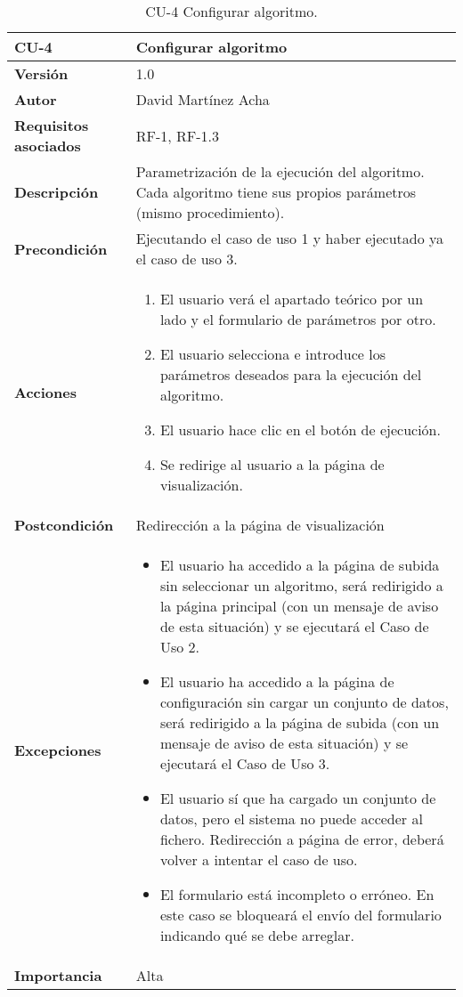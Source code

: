 \begin{table}[p]
	\centering
	\begin{tabularx}{\linewidth}{ p{} p{} }
		\toprule
		\textbf{CU-4}    & \textbf{Configurar algoritmo}\\
		\toprule
		\textbf{Versión}              & 1.0    \\
		\textbf{Autor}                & David Martínez Acha \\
		\textbf{Requisitos asociados} & RF-1, RF-1.3 \\
		\textbf{Descripción}          & Parametrización de la ejecución del algoritmo. Cada algoritmo tiene sus propios parámetros (mismo procedimiento). \\
		\textbf{Precondición}         & Ejecutando el caso de uso 1 y haber ejecutado ya el caso de uso 3. \\
		\textbf{Acciones}             &
		\begin{enumerate}
			\def\labelenumi{\arabic{enumi}.}
			\tightlist
			\item El usuario verá el apartado teórico por un lado y el formulario de parámetros por otro.
			\item El usuario selecciona e introduce los parámetros deseados para la ejecución del algoritmo.
			\item El usuario hace clic en el botón de ejecución.
			\item Se redirige al usuario a la página de visualización.
		\end{enumerate}\\
		\textbf{Postcondición}        & Redirección a la página de visualización \\
		\textbf{Excepciones}          & \begin{itemize}
			\item El usuario ha accedido a la página de subida sin seleccionar un algoritmo, será redirigido a la página principal (con un mensaje de aviso de esta situación) y se ejecutará el Caso de Uso 2.
			\item El usuario ha accedido a la página de configuración sin cargar un conjunto de datos, será redirigido a la página de subida (con un mensaje de aviso de esta situación) y se ejecutará el Caso de Uso 3.
			\item El usuario sí que ha cargado un conjunto de datos, pero el sistema no puede acceder al fichero. Redirección a página de error, deberá volver a intentar el caso de uso.
			\item El formulario está incompleto o erróneo. En este caso se bloqueará el envío del formulario indicando qué se debe arreglar.
		\end{itemize} \\
		\textbf{Importancia}          & Alta \\
		\bottomrule
	\end{tabularx}
	\caption{CU-4 Configurar algoritmo.}
\end{table}

